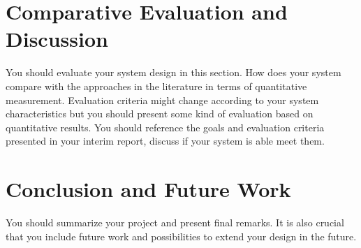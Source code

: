 \documentclass[a4paper, 12pt, titlepage]{article}
\begin{document}
\newpage
\section{Comparative Evaluation and Discussion}
You should evaluate your system design in this section. How does your system compare with the approaches in the literature in terms of quantitative measurement. Evaluation criteria might change according to your system characteristics but you should present some kind of evaluation based on quantitative results. You should reference the goals and evaluation criteria presented in your interim report, discuss if your system is able meet them.

\newpage
\section{Conclusion and Future Work}
You should summarize your project and present final remarks. It is also crucial that you include future work and possibilities to extend your design in the future.

\newpage

 
\end{document}
